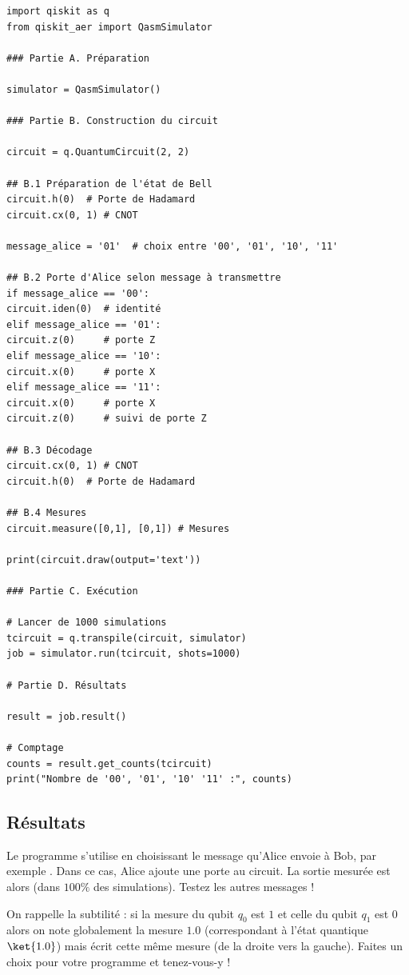 \documentclass[11pt,class=report,crop=false]{standalone}
\begin{document}
\begin{lstlisting}
import qiskit as q
from qiskit_aer import QasmSimulator

### Partie A. Préparation

simulator = QasmSimulator()

### Partie B. Construction du circuit

circuit = q.QuantumCircuit(2, 2)

## B.1 Préparation de l'état de Bell
circuit.h(0)  # Porte de Hadamard
circuit.cx(0, 1) # CNOT

message_alice = '01'  # choix entre '00', '01', '10', '11'

## B.2 Porte d'Alice selon message à transmettre
if message_alice == '00':
circuit.iden(0)  # identité
elif message_alice == '01':
circuit.z(0)     # porte Z
elif message_alice == '10':
circuit.x(0)     # porte X
elif message_alice == '11':
circuit.x(0)     # porte X
circuit.z(0)     # suivi de porte Z	

## B.3 Décodage
circuit.cx(0, 1) # CNOT
circuit.h(0)  # Porte de Hadamard

## B.4 Mesures
circuit.measure([0,1], [0,1]) # Mesures

print(circuit.draw(output='text'))

### Partie C. Exécution 

# Lancer de 1000 simulations
tcircuit = q.transpile(circuit, simulator)
job = simulator.run(tcircuit, shots=1000)

# Partie D. Résultats

result = job.result()

# Comptage
counts = result.get_counts(tcircuit)
print("Nombre de '00', '01', '10' '11' :", counts)
\end{lstlisting}


\subsection{Résultats}

Le programme s'utilise en choisissant le message qu'Alice envoie à Bob, par exemple . Dans ce cas, Alice ajoute une porte  au circuit. La sortie mesurée est alors  (dans $100\%$ des simulations). Testez les autres messages !

On rappelle la subtilité : si la mesure du qubit $q_0$ est $1$ et celle du qubit $q_1$ est $0$ alors on note globalement la mesure $1.0$ (correspondant à l'état quantique $\ket{1.0}$) mais \qiskit{} écrit cette même mesure  (de la droite vers la gauche). Faites un choix pour votre programme et tenez-vous-y !
\end{document}
